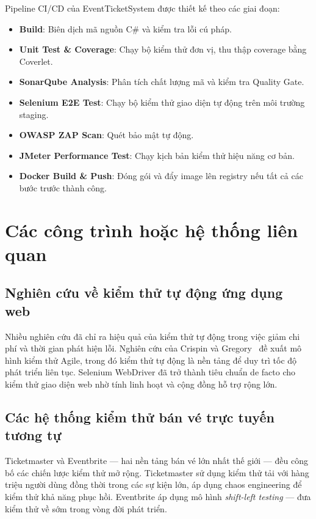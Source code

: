 \documentclass[../main.tex]{subfiles}
\begin{document}
Pipeline CI/CD của EventTicketSystem được thiết kế theo các giai đoạn:

\begin{itemize}
    \item \textbf{Build}: Biên dịch mã nguồn C\# và kiểm tra lỗi cú pháp.
    \item \textbf{Unit Test \& Coverage}: Chạy bộ kiểm thử đơn vị, thu thập coverage bằng Coverlet.
    \item \textbf{SonarQube Analysis}: Phân tích chất lượng mã và kiểm tra Quality Gate.
    \item \textbf{Selenium E2E Test}: Chạy bộ kiểm thử giao diện tự động trên môi trường staging.
    \item \textbf{OWASP ZAP Scan}: Quét bảo mật tự động.
    \item \textbf{JMeter Performance Test}: Chạy kịch bản kiểm thử hiệu năng cơ bản.
    \item \textbf{Docker Build \& Push}: Đóng gói và đẩy image lên registry nếu tất cả các bước trước thành công.
\end{itemize}

\section{Các công trình hoặc hệ thống liên quan}

\subsection{Nghiên cứu về kiểm thử tự động ứng dụng web}

Nhiều nghiên cứu đã chỉ ra hiệu quả của kiểm thử tự động trong việc giảm chi phí và thời gian phát hiện lỗi. Nghiên cứu của Crispin và Gregory~\cite{crispin2009agile} đề xuất mô hình kiểm thử Agile, trong đó kiểm thử tự động là nền tảng để duy trì tốc độ phát triển liên tục. Selenium WebDriver đã trở thành tiêu chuẩn de facto cho kiểm thử giao diện web nhờ tính linh hoạt và cộng đồng hỗ trợ rộng lớn.

\subsection{Các hệ thống kiểm thử bán vé trực tuyến tương tự}

Ticketmaster và Eventbrite — hai nền tảng bán vé lớn nhất thế giới — đều công bố các chiến lược kiểm thử mở rộng. Ticketmaster sử dụng kiểm thử tải với hàng triệu người dùng đồng thời trong các sự kiện lớn, áp dụng chaos engineering để kiểm thử khả năng phục hồi. Eventbrite áp dụng mô hình \textit{shift-left testing} — đưa kiểm thử về sớm trong vòng đời phát triển.
\end{document}
